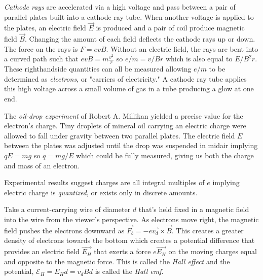 \begin{definition}
    \emph{Cathode rays} are accelerated via a high voltage and pass between a pair of parallel plates built into a cathode ray tube. When another voltage is applied to the plates, an electric field $\vec{E}$ is produced and a pair of coil produce magnetic field $\vec{B}.$ Changing the amount of each field deflects the cathode rays up or down. The force on the rays is $F = evB$. Without an electric field, the rays are bent into a curved path such that $evB = m\frac{v^2}{r}$ so $e/m = v/Br$ which is also equal to $E/B^2r$. These righthandside quantities can all be measured allowing $e/m$ to be determined as \emph{electrons}, or "carriers of electricity." A cathode ray tube applies this high voltage across a small volume of gas in a tube producing a glow at one end.
\end{definition}
\begin{remark}
    The \emph{oil-drop experiment} of Robert A. Millikan yielded a precise value for the electron's charge. Tiny droplets of mineral oil carrying an electric charge were allowed to fall under gravity between two parallel plates. The electric field $E$ between the plates was adjusted until the drop was suspended in midair implying $qE = mg$ so $q = mg/E$ which could be fully measured, giving us both the charge and mass of an electron.
\end{remark}
\begin{definition}
    Experimental results suggest charges are all integral multiples of $e$ implying electric charge is \emph{quantized}, or exists only in discrete amounts.
\end{definition}
\begin{remark}
    Take a current-carrying wire of diameter $d$ that's held fixed in a magnetic field into the wire from the viewer's perspective. As electrons move right, the magnetic field pushes the electrons downward as $\vec{F_b} = -e\vec{v_d}\times\vec{B}$. This creates a greater density of electrons towards the bottom which creates a potential difference that provides an electric field $\vec{E_H}$ that exerts a force $e\vec{E_H}$ on the moving charges equal and opposite to the magnetic force. This is called the \emph{Hall effect} and the potential, $\mathscr{E}_H = E_Hd = v_dBd$ is called the \emph{Hall emf}. 
\end{remark}
